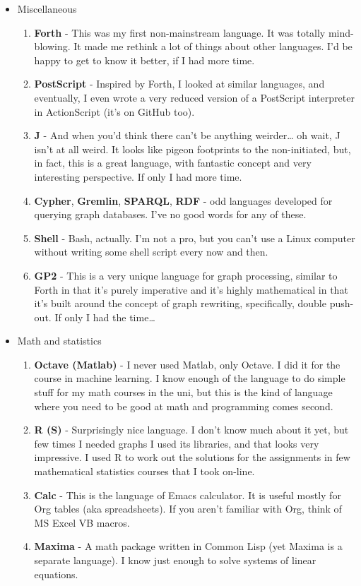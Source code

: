 \documentclass[oneside]{memoir}
\begin{document}
\begin{itemize}
\item Miscellaneous
\begin{enumerate}
\item \textbf{Forth} - This was my first non-mainstream language.  It was totally
mind-blowing.  It made me rethink a lot of things about other languages.
I'd be happy to get to know it better, if I had more time.
\item \textbf{PostScript} - Inspired by Forth, I looked at similar languages, and
eventually, I even wrote a very reduced version of a PostScript
interpreter in ActionScript (it's on GitHub too).
\item \textbf{J} - And when you'd think there can't be anything weirder\ldots{} oh wait,
J isn't at all weird.  It looks like pigeon footprints to the
non-initiated, but, in fact, this is a great language, with fantastic
concept and very interesting perspective.  If only I had more time.
\item \textbf{Cypher}, \textbf{Gremlin}, \textbf{SPARQL}, \textbf{RDF} - odd languages developed for
querying graph databases.  I've no good words for any of these.
\item \textbf{Shell} - Bash, actually. I'm not a pro, but you can't use a Linux
computer without writing some shell script every now and then.
\item \textbf{GP2} - This is a very unique language for graph processing, similar
to Forth in that it's purely imperative and it's highly mathematical
in that it's built around the concept of graph rewriting, specifically,
double push-out.  If only I had the time\ldots{}
\end{enumerate}

\item Math and statistics
\begin{enumerate}
\item \textbf{Octave (Matlab)} - I never used Matlab, only Octave.  I did it for the
course in machine learning.  I know enough of the language to do simple
stuff for my math courses in the uni, but this is the kind of language
where you need to be good at math and programming comes second.
\item \textbf{R (S)} - Surprisingly nice language.  I don't know much about it yet, but
few times I needed graphs I used its libraries, and that looks very
impressive.  I used R to work out the solutions for the assignments in
few mathematical statistics courses that I took on-line.
\item \textbf{Calc} - This is the language of Emacs calculator.  It is useful mostly
for Org tables (aka spreadsheets).  If you aren't familiar with Org,
think of MS Excel VB macros.
\item \textbf{Maxima} - A math package written in Common Lisp (yet Maxima is a 
separate language).  I know just enough to solve systems of linear
equations.
\end{enumerate}


\end{itemize}
\end{document}
